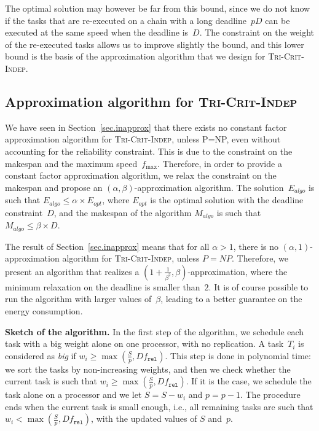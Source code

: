 \documentclass[a4paper]{article}
\theoremstyle{plain}
\theoremstyle{definition}
\theoremstyle{remark}
\newcommand{\fmax}{\ensuremath{f_{\max}}\xspace}
\newcommand{\fr}{\ensuremath{f_{\texttt{rel}}}\xspace}
\newcommand{\indep}{\textsc{Tri-Crit-In\-dep}\xspace}
\begin{document}
The optimal solution may however be far from this bound, since we do
not know if the tasks that are re-executed on a chain with a long
deadline~$pD$ can be executed at the same speed when the deadline
is~$D$. The constraint on the weight of the re-executed tasks allows
us to improve slightly the bound, and this lower bound is the basis of
the approximation algorithm that we design for \indep. 



\subsection{Approximation algorithm for \indep}
\label{algo.indep}



We have seen in Section~\ref{sec.inapprox} that there exists no
constant factor approximation algorithm for \indep, unless P=NP, even
without accounting for the reliability constraint. This is due to the
constraint on the makespan and the maximum speed~\fmax. Therefore, in
order to provide a constant factor approximation algorithm, we relax
the constraint on the makespan and propose an
$(\alpha,\beta)$-approxi\-mation algorithm. The solution~$E_{algo}$ is
such that $E_{algo} \leq \alpha \times E_{opt}$, where $E_{opt}$ is
the optimal solution with the deadline constraint~$D$, and the
makespan of the algorithm $M_{algo}$ is such that $M_{algo}\leq \beta
\times D$. 

The result of Section~\ref{sec.inapprox} means that for all $\alpha
>1$, there is no $(\alpha,1)$-approxi\-mation algorithm for \indep,
unless $P=NP$.  Therefore, we present 
an algorithm that realizes a $(1+\frac{1}{\beta^2},\beta)$-approximation, where the minimum relaxation on
the deadline is smaller than~$2$. It is of course
possible to run the algorithm with larger values of~$\beta$, leading
to a better guarantee on the energy consumption. 




\medskip
{\bf Sketch of the algorithm.}  In the first step of the algorithm, we
schedule each task with a big weight alone on one
processor, with no replication. A task~$T_i$ is considered as {\em big}
if $w_i \geq \max(\frac{S}{p},D\fr)$. This step is done
in polynomial time: we sort the tasks by non-increasing
weights, and then we check whether the current task is such that $w_i \geq
\max(\frac{S}{p},D\fr)$. If it is the case, we schedule the task alone
on a processor and we let $S=S-w_i$ and $p=p-1$. The procedure ends
when the current task is small enough, i.e., all remaining tasks
are such that $w_i < \max(\frac{S}{p},D\fr)$, with the updated values
of $S$ and~$p$. 
\end{document}
